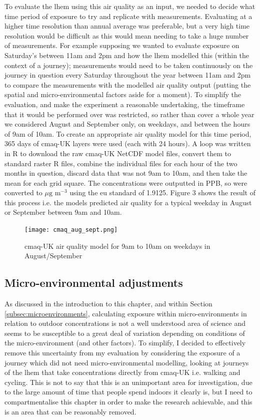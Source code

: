 To evaluate the \gls{lhem} using this air quality as an input, we needed to decide what time period of exposure to try and replicate with measurements. Evaluating at a higher time resolution than annual average was preferable, but a very high time resolution would be difficult as this would mean needing to take a huge number of measurements. For example supposing we wanted to evaluate exposure on Saturday’s between 11am and 2pm and how the \gls{lhem} modelled this (within the context of a journey); measurements would need to be taken continuously on the journey in question every Saturday throughout the year between 11am and 2pm to compare the measurements with the modelled air quality output (putting the spatial and micro-environmental factors aside for a moment). 
To simplify the evaluation, and make the experiment a reasonable undertaking, the timeframe that it would be performed over was restricted, so rather than cover a whole year we considered August and September only, on weekdays, and between the hours of 9am of 10am. To create an appropriate air quality model for this time period, 365 days of \gls{cmaq}-UK layers were used (each with 24 hours). A loop was written in R to download the raw \gls{cmaq}-UK NetCDF model files, convert them to standard raster R files, combine the individual files for each hour of the two months in question, discard data that was not 9am to 10am, and then take the mean for each grid square. The concentrations were outputted in PPB, so were converted to $\mu \text{g m}^{-3}$ using the \gls{eu} standard of 1.9125. Figure 3 shows the result of this process i.e. the models predicted air quality for a typical weekday in August or September between 9am and 10am.

\begin{figure}[H]
\centering
\texttt{[image: cmaq\_aug\_sept.png]}
\caption{\gls{cmaq}-UK air quality model for 9am to 10am on weekdays in August/September}
\label{fig:cmaq_aug_sept}
\end{figure}

\subsection{Micro-environmental adjustments}
\label{subsec:4microenvironmentaladjustments}

As discussed in the introduction to this chapter, and within  Section \ref{subsec:microenvironments}, calculating exposure within micro-environments in relation to outdoor concentrations is not a well understood area of science and seems to be susceptible to a great deal of variation depending on conditions of the micro-environment (and other factors). To simplify, I decided to effectively remove this uncertainty from my evaluation by considering the exposure of a journey which did not need micro-environmental modelling, looking at journeys of the \gls{lhem} that take concentrations directly from \gls{cmaq}-UK i.e. walking and cycling. This is not to say that this is an unimportant area for investigation, due to the large amount of time that people spend indoors it clearly is, but I need to compartmentalise this chapter in order to make the research achievable, and this is an area that can be reasonably removed.

